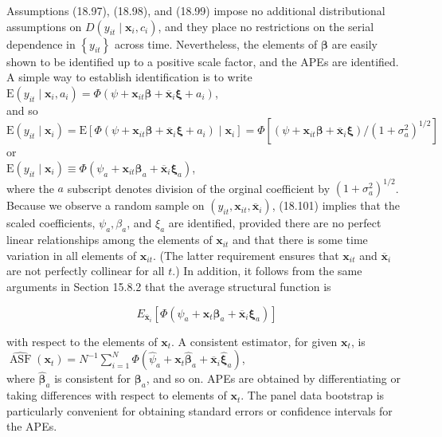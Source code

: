 \documentclass[10pt]{article}
\begin{document}
Assumptions (18.97), (18.98), and (18.99) impose no additional distributional assumptions on $D\left(y_{i t} \mid \mathbf{x}_{i}, c_{i}\right)$, and they place no restrictions on the serial dependence in $\left\{y_{i t}\right\}$ across time. Nevertheless, the elements of $\boldsymbol{\beta}$ are easily shown to be identified up to a positive scale factor, and the APEs are identified. A simple way to establish identification is to write\\
$\mathrm{E}\left(y_{i t} \mid \mathbf{x}_{i}, a_{i}\right)=\Phi\left(\psi+\mathbf{x}_{i t} \boldsymbol{\beta}+\overline{\mathbf{x}}_{i} \boldsymbol{\xi}+a_{i}\right)$,\\
and so\\
$\mathrm{E}\left(y_{i t} \mid \mathbf{x}_{i}\right)=\mathrm{E}\left[\Phi\left(\psi+\mathbf{x}_{i t} \boldsymbol{\beta}+\overline{\mathbf{x}}_{i} \boldsymbol{\xi}+a_{i}\right) \mid \mathbf{x}_{i}\right]=\Phi\left[\left(\psi+\mathbf{x}_{i t} \boldsymbol{\beta}+\overline{\mathbf{x}}_{i} \boldsymbol{\xi}\right) /\left(1+\sigma_{a}^{2}\right)^{1 / 2}\right]$\\
or\\
$\mathrm{E}\left(y_{i t} \mid \mathbf{x}_{i}\right) \equiv \Phi\left(\psi_{a}+\mathbf{x}_{i t} \boldsymbol{\beta}_{a}+\overline{\mathbf{x}}_{i} \boldsymbol{\xi}_{a}\right)$,\\
where the $a$ subscript denotes division of the orginal coefficient by $\left(1+\sigma_{a}^{2}\right)^{1 / 2}$. Because we observe a random sample on $\left(y_{i t}, \mathbf{x}_{i t}, \overline{\mathbf{x}}_{i}\right)$, (18.101) implies that the scaled coefficients, $\psi_{a}, \beta_{a}$, and $\xi_{a}$ are identified, provided there are no perfect linear relationships among the elements of $\mathbf{x}_{i t}$ and that there is some time variation in all elements of $\mathbf{x}_{i t}$. (The latter requirement ensures that $\mathbf{x}_{i t}$ and $\overline{\mathbf{x}}_{i}$ are not perfectly collinear for all $t$.) In addition, it follows from the same arguments in Section 15.8.2 that the average structural function is


\begin{equation*}
E_{\overline{\mathbf{x}}_{i}}\left[\Phi\left(\psi_{a}+\mathbf{x}_{t} \boldsymbol{\beta}_{a}+\overline{\mathbf{x}}_{i} \boldsymbol{\xi}_{a}\right)\right] \tag{18.102}
\end{equation*}


with respect to the elements of $\mathbf{x}_{t}$. A consistent estimator, for given $\mathbf{x}_{t}$, is\\
$\widehat{\operatorname{ASF}}\left(\mathbf{x}_{t}\right)=N^{-1} \sum_{i=1}^{N} \Phi\left(\hat{\psi}_{a}+\mathbf{x}_{t} \hat{\boldsymbol{\beta}}_{a}+\overline{\mathbf{x}}_{i} \hat{\boldsymbol{\xi}}_{a}\right)$,\\
where $\hat{\boldsymbol{\beta}}_{a}$ is consistent for $\boldsymbol{\beta}_{a}$, and so on. APEs are obtained by differentiating or taking differences with respect to elements of $\mathbf{x}_{t}$. The panel data bootstrap is particularly convenient for obtaining standard errors or confidence intervals for the APEs.
\end{document}
